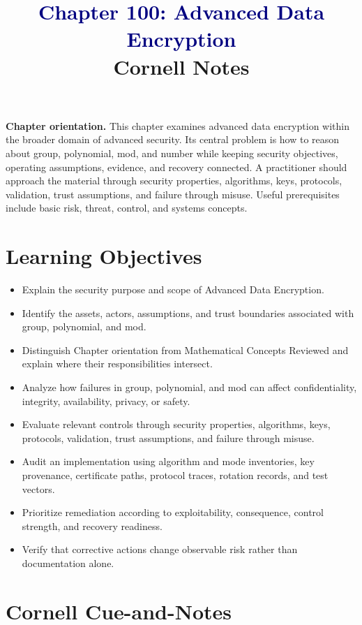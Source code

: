 \documentclass[11pt]{article}
\title{\textcolor{Navy}{Chapter 100: Advanced Data Encryption}\\[2mm]\large Cornell Notes}
\author{}
\date{}
\begin{document}
\maketitle
\thispagestyle{fancy}
\vspace{-1.5em}
\begin{orientationbox}
\textbf{Chapter orientation.} This chapter examines advanced data encryption within the broader domain of advanced security. Its central problem is how to reason about group, polynomial, mod, and number while keeping security objectives, operating assumptions, evidence, and recovery connected. A practitioner should approach the material through security properties, algorithms, keys, protocols, validation, trust assumptions, and failure through misuse. Useful prerequisites include basic risk, threat, control, and systems concepts.
\end{orientationbox}
\section*{Learning Objectives}
\begin{itemize}
\item Explain the security purpose and scope of Advanced Data Encryption.
\item Identify the assets, actors, assumptions, and trust boundaries associated with group, polynomial, and mod.
\item Distinguish Chapter orientation from Mathematical Concepts Reviewed and explain where their responsibilities intersect.
\item Analyze how failures in group, polynomial, and mod can affect confidentiality, integrity, availability, privacy, or safety.
\item Evaluate relevant controls through security properties, algorithms, keys, protocols, validation, trust assumptions, and failure through misuse.
\item Audit an implementation using algorithm and mode inventories, key provenance, certificate paths, protocol traces, rotation records, and test vectors.
\item Prioritize remediation according to exploitability, consequence, control strength, and recovery readiness.
\item Verify that corrective actions change observable risk rather than documentation alone.
\end{itemize}
\section*{Cornell Cue-and-Notes}
\end{document}
